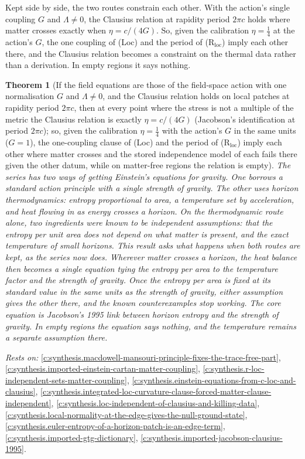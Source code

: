 \documentclass[11pt]{article}
\newtheorem{theorem}{Theorem}[section]
\theoremstyle{definition}
\theoremstyle{plain}
\begin{document}
Kept side by side, the two routes constrain each other. With the action's single coupling $G$ and $\Lambda \neq 0$, the Clausius relation at rapidity period $2\pi c$ holds where matter crosses exactly when $\eta = c/(4G)$. So, given the calibration $\eta = \tfrac14$ at the action's $G$, the one coupling of (Loc) and the period of (R$_{\mathrm{loc}}$) imply each other there, and the Clausius relation becomes a constraint on the thermal data rather than a derivation. In empty regions it says nothing.

\begin{theorem}[If the field equations are those of the field-space action with one normalisation $G$ and $\Lambda \neq 0$, and the Clausius relation holds on local patches at rapidity period $2\pi c$, then at every point where the stress is not a multiple of the metric the Clausius relation is exactly $\eta = c/(4G)$ (Jacobson's identification at period $2\pi c$); so, given the calibration $\eta = \tfrac14$ with the action's $G$ in the same units ($G = 1$), the one-coupling clause of (Loc) and the period of (R$_{\mathrm{loc}}$) imply each other where matter crosses and the stored independence model of each fails there given the other datum, while on matter-free regions the relation is empty]\label{c:synthesis.clausius-on-the-action-shell-ties-entropy-density-to-period}
The series has two ways of getting Einstein's equations for gravity. One borrows a standard action principle with a single strength of gravity. The other uses horizon thermodynamics: entropy proportional to area, a temperature set by acceleration, and heat flowing in as energy crosses a horizon. On the thermodynamic route alone, two ingredients were known to be independent assumptions: that the entropy per unit area does not depend on what matter is present, and the exact temperature of small horizons. This result asks what happens when both routes are kept, as the series now does. Wherever matter crosses a horizon, the heat balance then becomes a single equation tying the entropy per area to the temperature factor and the strength of gravity. Once the entropy per area is fixed at its standard value in the same units as the strength of gravity, either assumption gives the other there, and the known counterexamples stop working. The core equation is Jacobson's 1995 link between horizon entropy and the strength of gravity. In empty regions the equation says nothing, and the temperature remains a separate assumption there.
\end{theorem}
\noindent\emph{Rests on:} \ref{c:synthesis.macdowell-mansouri-principle-fixes-the-trace-free-part}, \ref{c:synthesis.imported-einstein-cartan-matter-coupling}, \ref{c:synthesis.r-loc-independent-sets-matter-coupling}, \ref{c:synthesis.einstein-equations-from-c-loc-and-clausius}, \ref{c:synthesis.integrated-loc-curvature-clause-forced-matter-clause-independent}, \ref{c:synthesis.loc-independent-of-clausius-and-killing-data}, \ref{c:synthesis.local-normality-at-the-edge-gives-the-null-ground-state}, \ref{c:synthesis.euler-entropy-of-a-horizon-patch-is-an-edge-term}, \ref{c:synthesis.imported-gtg-dictionary}, \ref{c:synthesis.imported-jacobson-clausius-1995}.
\end{document}

